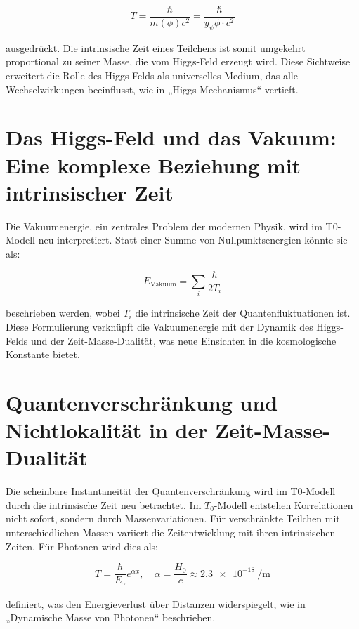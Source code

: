 \documentclass[a4paper,12pt]{article}
\begin{document}
	\begin{equation}
		T = \frac{\hbar}{m(\phi) c^2} = \frac{\hbar}{y_\psi \phi \cdot c^2}
	\end{equation}
	
	ausgedrückt. Die intrinsische Zeit eines Teilchens ist somit umgekehrt proportional zu seiner Masse, die vom Higgs-Feld erzeugt wird. Diese Sichtweise erweitert die Rolle des Higgs-Felds als universelles Medium, das alle Wechselwirkungen beeinflusst, wie in „Higgs-Mechanismus“ \cite{pascher_higgs_2025} vertieft.
	
	\section{Das Higgs-Feld und das Vakuum: Eine komplexe Beziehung mit intrinsischer Zeit}
	
	Die Vakuumenergie, ein zentrales Problem der modernen Physik, wird im T0-Modell neu interpretiert. Statt einer Summe von Nullpunktsenergien könnte sie als:
	
	\begin{equation}
		E_\text{Vakuum} = \sum_i \frac{\hbar}{2 T_i}
	\end{equation}
	
	beschrieben werden, wobei \(T_i\) die intrinsische Zeit der Quantenfluktuationen ist. Diese Formulierung verknüpft die Vakuumenergie mit der Dynamik des Higgs-Felds und der Zeit-Masse-Dualität, was neue Einsichten in die kosmologische Konstante bietet.
	
	\section{Quantenverschränkung und Nichtlokalität in der Zeit-Masse-Dualität}
	
	Die scheinbare Instantaneität der Quantenverschränkung wird im T0-Modell durch die intrinsische Zeit neu betrachtet. Im \(T_0\)-Modell entstehen Korrelationen nicht sofort, sondern durch Massenvariationen. Für verschränkte Teilchen mit unterschiedlichen Massen variiert die Zeitentwicklung mit ihren intrinsischen Zeiten. Für Photonen wird dies als:
	
	\begin{equation}
		T = \frac{\hbar}{E_{\gamma}} e^{\alpha x}, \quad \alpha = \frac{H_0}{c} \approx \SI{2.3e-18}{\per\meter}
	\end{equation}
	
	definiert, was den Energieverlust über Distanzen widerspiegelt, wie in „Dynamische Masse von Photonen“ \cite{pascher_photons_2025} beschrieben.
	
\end{document}
